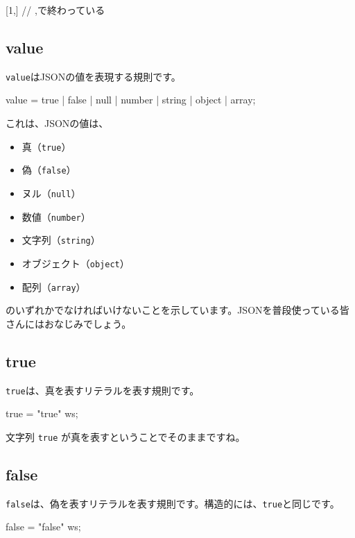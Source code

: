 \begin{codescreen}{}
[1,] // ,で終わっている
\end{codescreen}

\subsection{value}

\texttt{value}はJSONの値を表現する規則です。

\begin{codescreen}{}
value = true | false | null | number | string | object | array;
\end{codescreen}

これは、JSONの値は、

\begin{itemize}
\item
  真（\texttt{true}）
\item
  偽（\texttt{false}）
\item
  ヌル（\texttt{null}）
\item
  数値（\texttt{number}）
\item
  文字列（\texttt{string}）
\item
  オブジェクト（\texttt{object}）
\item
  配列（\texttt{array}）
\end{itemize}

\noindent のいずれかでなければいけないことを示しています。JSONを普段使っている皆さんにはおなじみでしょう。

\subsection{true}

\texttt{true}は、真を表すリテラルを表す規則です。

\begin{codescreen}{}
true = "true" ws;
\end{codescreen}

文字列 \texttt{true} が真を表すということでそのままですね。

\subsection{false}

\texttt{false}は、偽を表すリテラルを表す規則です。構造的には、\texttt{true}と同じです。

\begin{codescreen}{}
false = "false" ws;
\end{codescreen}

